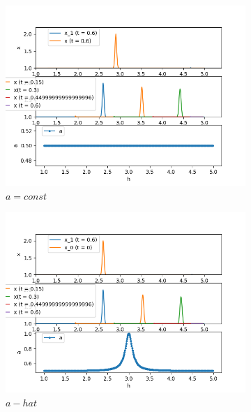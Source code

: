 \documentclass{article}
\begin{document}
\begin{figure}[h]
    \caption{Гауссиан}
    \begin{subfigure}{0.33\textwidth}
    {\includegraphics[width=1\linewidth]{tests_bcomp/a_const_x0_gauss.png} \\$a=const$}
    \end{subfigure}
    \begin{subfigure}{0.33\textwidth}
    {\includegraphics[width=1\linewidth]{tests_bcomp/a_hat_x0_gauss.png} \\$a - hat$}
    \end{subfigure}
    \begin{subfigure}{0.33\textwidth}

\end{subfigure}
\end{figure}
\end{document}
